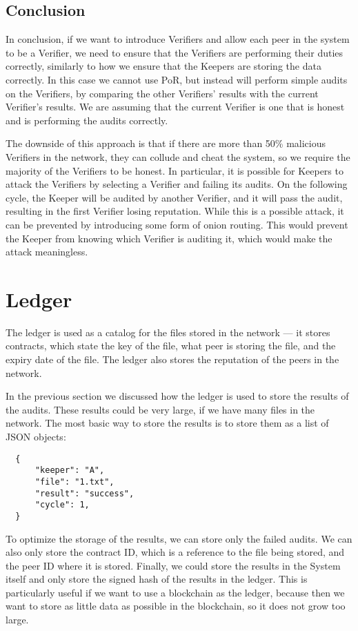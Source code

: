 \subsection{Conclusion}

In conclusion, if we want to introduce Verifiers and allow each peer in the system to be a Verifier,
we need to ensure that the Verifiers are performing their duties correctly,
similarly to how we ensure that the Keepers are storing the data correctly.
In this case we cannot use PoR, but instead will perform simple audits on the Verifiers,
by comparing the other Verifiers' results with the current Verifier's results.
We are assuming that the current Verifier is one that is honest and is performing the audits correctly.

The downside of this approach is that if there are more than 50\% malicious Verifiers in the network,
they can collude and cheat the system,
so we require the majority of the Verifiers to be honest.
In particular, it is possible for Keepers to attack the Verifiers by
selecting a Verifier and failing its audits.
On the following cycle, the Keeper will be audited by another Verifier,
and it will pass the audit, resulting in the first Verifier losing reputation.
While this is a possible attack, it can be prevented by introducing some form of
onion routing.
This would prevent the Keeper from knowing which Verifier is auditing it,
which would make the attack meaningless.

\section{Ledger}

The ledger is used as a catalog for the files stored in the network ---
it stores contracts, which state the key of the file, what peer is storing the file,
and the expiry date of the file.
The ledger also stores the reputation of the peers in the network.

In the previous section we discussed how the ledger is used to store the results of the audits.
These results could be very large, if we have many files in the network.
The most basic way to store the results is to store them as a list of JSON objects:

\begin{verbatim}
  {
      "keeper": "A",
      "file": "1.txt",
      "result": "success",
      "cycle": 1,
  }
\end{verbatim}

To optimize the storage of the results, we can store only the failed audits.
We can also only store the contract ID, which is a reference to the file being stored, and the peer ID
where it is stored.
Finally, we could store the results in the System itself and only store the signed hash of the results in the ledger.
This is particularly useful if we want to use a blockchain as the ledger, because then we want to
store as little data as possible in the blockchain, so it does not grow too large.

